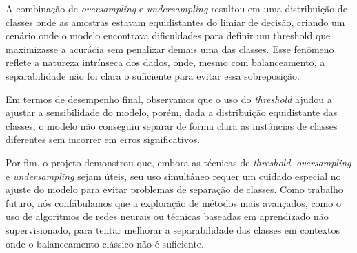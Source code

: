\documentclass{abntpuc}
\begin{document}
A combinação de \textit{oversampling} e \textit{undersampling} resultou em uma distribuição de classes onde as amostras estavam equidistantes do limiar de decisão, criando um cenário onde o modelo encontrava dificuldades para definir um threshold que maximizasse a acurácia sem penalizar demais uma das classes. Esse fenômeno reflete a natureza intrínseca dos dados, onde, mesmo com balanceamento, a separabilidade não foi clara o suficiente para evitar essa sobreposição.

Em termos de desempenho final, observamos que o uso do \textit{threshold} ajudou a ajustar a sensibilidade do modelo, porém, dada a distribuição equidistante das classes, o modelo não conseguiu separar de forma clara as instâncias de classes diferentes sem incorrer em erros significativos.

Por fim, o projeto demonstrou que, embora as técnicas de \textit{threshold}, \textit{oversampling} e \textit{undersampling} sejam úteis, seu uso simultâneo requer um cuidado especial no ajuste do modelo para evitar problemas de separação de classes. Como trabalho futuro, nós confábulamos que a exploração de métodos mais avançados, como o uso de algoritmos de redes neurais ou técnicas baseadas em aprendizado não supervisionado, para tentar melhorar a separabilidade das classes em contextos onde o balanceamento clássico não é suficiente.

\renewcommand\bibname{REFERÊNCIAS}
\addcontentsline{toc}{chapter}{\bibname}

\end{document}
